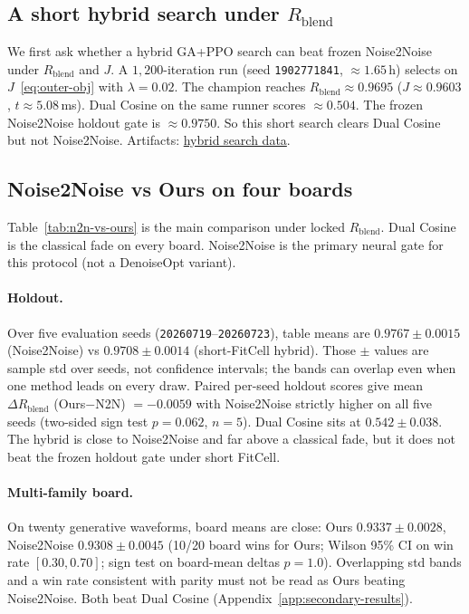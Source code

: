 \subsection{A short hybrid search under $R_{\mathrm{blend}}$}
\label{sec:v10-freeze}

We first ask whether a hybrid GA+PPO search can beat frozen Noise2Noise under $R_{\mathrm{blend}}$ and $J$.
A $1{,}200$-iteration run (seed \texttt{1902771841}, ${\approx}1.65$\,h) selects on $J$~\eqref{eq:outer-obj} with $\lambda{=}0.02$.
The champion reaches $R_{\mathrm{blend}}{\approx}0.9695$ ($J{\approx}0.9603$, $t{\approx}5.08$\,ms).
Dual Cosine on the same runner scores ${\approx}0.504$.
The frozen Noise2Noise holdout gate is ${\approx}0.9750$.
So this short search clears Dual Cosine but not Noise2Noise.
Artifacts:
\href{https://github.com/reeldemo/denoise-opt-meta/blob/master/paper/Unsupervised_Wrap-Discontinuity_Repair_in_Wavetable_Synthesis_via_Hybrid_GA-PPO_Meta-Search_v12/figures/meta_approach_compare_v10.json}{hybrid search data}.

\subsection{Noise2Noise vs Ours on four boards}
\label{sec:n2n-vs-ours-boards}

Table~\ref{tab:n2n-vs-ours} is the main comparison under locked $R_{\mathrm{blend}}$.
Dual Cosine is the classical fade on every board.
Noise2Noise is the primary neural gate for this protocol (not a DenoiseOpt variant).

\paragraph{Holdout.}
Over five evaluation seeds (\texttt{20260719}--\texttt{20260723}), table means are
$0.9767{\pm}0.0015$ (Noise2Noise) vs $0.9708{\pm}0.0014$ (short-FitCell hybrid).
Those $\pm$ values are sample std over seeds, not confidence intervals; the bands can overlap even when one method leads on every draw.
Paired per-seed holdout scores give mean $\Delta R_{\mathrm{blend}}$ (Ours$-$N2N) $={-}0.0059$ with Noise2Noise strictly higher on all five seeds (two-sided sign test $p{=}0.062$, $n{=}5$).
Dual Cosine sits at $0.542{\pm}0.038$.
The hybrid is close to Noise2Noise and far above a classical fade, but it does not beat the frozen holdout gate under short FitCell.

\paragraph{Multi-family board.}
On twenty generative waveforms, board means are close:
Ours $0.9337{\pm}0.0028$, Noise2Noise $0.9308{\pm}0.0045$
(10/20 board wins for Ours; Wilson 95\% CI on win rate $[0.30,0.70]$; sign test on board-mean deltas $p{=}1.0$).
Overlapping std bands and a win rate consistent with parity must not be read as Ours beating Noise2Noise.
Both beat Dual Cosine (Appendix~\ref{app:secondary-results}).

